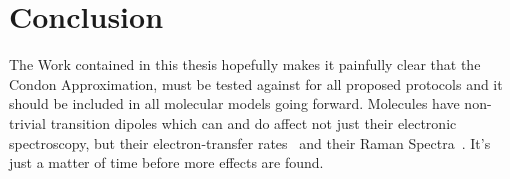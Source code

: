 \chapter{Conclusion}
\dsp

The Work contained in this thesis hopefully makes it painfully clear that the Condon Approximation, must be tested against for all proposed protocols and it should be included in all molecular models going forward.  Molecules have non-trivial transition dipoles which can and do affect not just their electronic spectroscopy, but their electron-transfer rates~\cite{MavrosNonCondon} and their Raman Spectra~\cite{hellerGraphene}.  It's just a matter of time before more effects are found.
